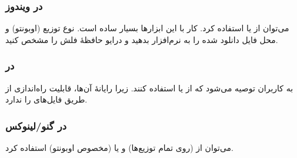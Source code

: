 \subsubsection{در ویندوز}
می‌توان از  یا  استفاده کرد. کار با این ابزارها بسیار ساده است. نوع توزیع (اوبونتو) و محل فایل  دانلود شده را به نرم‌افزار بدهید و درایو حافظهٔ فلش را مشخص کنید.

\subsubsection{در }
به کاربران  توصیه می‌شود که از  یا  استفاده کنند. زیرا رایانهٔ  آن‌ها، قابلیت راه‌اندازی از طریق فایل‌های  را ندارد.

\subsubsection{در گنو/لینوکس}
می‌توان از  (روی تمام توزیع‌ها) و یا  (مخصوص اوبونتو) استفاده کرد.


